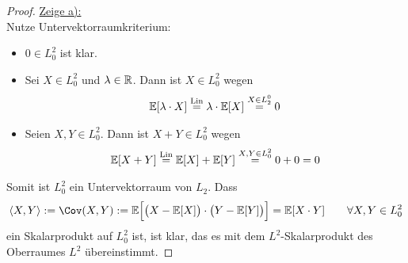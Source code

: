 \documentclass[12pt,a4paper]{article}
\begin{document}
\begin{proof}
\underline{Zeige a):}\\
Nutze Untervektorraumkriterium:
\begin{itemize}
\item $0\in L_0^2$ ist klar.
\item Sei $X\in L_0^2$ und $\lambda\in\mathbb{R}$. Dann ist $X\in L_0^2$ wegen
\begin{align*}
\mathbb{E}[\lambda\cdot X]\stackrel{\text{Lin}}{=}\lambda\cdot\mathbb{E}[X]\stackrel{X\in L_2^0}{=}0
\end{align*}
\item Seien $X,Y\in L_0^2$. Dann ist $X+Y\in L_0^2$ wegen
\begin{align*}
\mathbb{E}[X+Y]\stackrel{\text{Lin}}{=}\mathbb{E}[X]+\mathbb{E}[Y]\stackrel{X,Y\in L_0^2}{=}0+0=0
\end{align*}
\end{itemize}
Somit ist $L_0^2$ ein Untervektorraum von $L_2$. Dass
\begin{align*}
\langle X,Y\rangle:=\Cov(X,Y):=
\E\Big[\big(X-\E[X]\big)\cdot\big(Y-\E[Y]\big)\Big]
=\E[X\cdot Y]
\qquad\forall X,Y\in L_0^2
\end{align*}
ein Skalarprodukt auf $L_0^2$ ist, ist klar, das es mit dem $L^2$-Skalarprodukt des Oberraumes $L^2$ übereinstimmt.


\end{proof}
\end{document}
